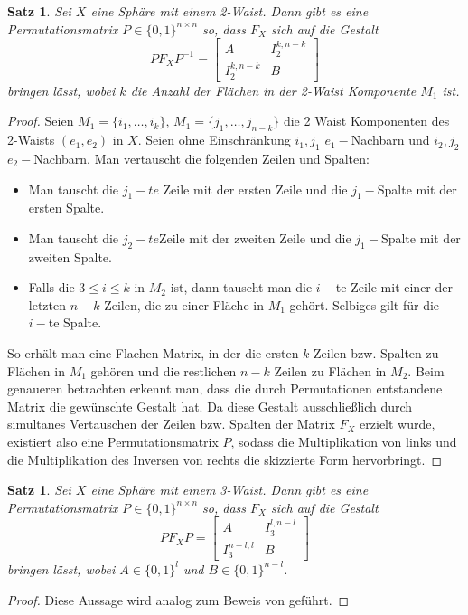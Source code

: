 \documentclass[12pt,titlepage,twoside,cleardoublepage]{article}
\theoremstyle{nummermitklammern}
\newtheorem{satz}[temp]{Satz}
\newtheorem{satz}[zahl]{Satz}
\numberwithin{equation}{section}
\begin{document}
\begin{satz}\label{mat2w}
Sei $X$ eine Sphäre mit einem 2-Waist. Dann gibt es eine Permutationsmatrix $P\in \{0,1\}^{n\times n}$ so, dass $F_X$ sich auf die Gestalt 
\[
PF_XP^{-1}=
\left[ 
\begin{array}{c|c} 
  A & I^{k,n-k}_2 \\ 
  \hline 
  I^{k,n-k}_2 & B 
\end{array} 
\right]
\] 
bringen lässt, wobei $k$ die Anzahl der Flächen in der 2-Waist Komponente $M_1$ ist.
\end{satz}
\begin{proof}
Seien $M_1=\{i_1,\ldots,i_k\}$, $M_1=\{j_1,\ldots,j_{n-k}\}$ die 2 Waist Komponenten des 2-Waists $(e_1,e_2)$ in $X$. Seien ohne Einschränkung $i_1,j_1$ $e_1-$Nachbarn und $i_2,j_2$ $e_2-$Nachbarn. Man vertauscht die folgenden Zeilen und Spalten:
\begin{itemize}
\item Man tauscht die $j_1-te$ Zeile mit der ersten Zeile und die  $j_1-$Spalte mit der ersten Spalte.
\item Man tauscht die $j_2-te$Zeile mit der zweiten Zeile und die  $j_1-$Spalte mit der zweiten Spalte.
\item Falls die $3\leq i \leq k$ in $M_2$ ist, dann tauscht man die $i-$te Zeile mit einer der letzten $n-k$ Zeilen, die zu einer Fläche in $M_1$ gehört. Selbiges gilt für die $i-$te Spalte.
\end{itemize} 
So erhält man eine Flachen Matrix, in der die ersten $k$ Zeilen bzw. Spalten zu  Flächen in $M_1$ gehören und die restlichen $n-k$ Zeilen zu Flächen in $M_2$. Beim genaueren betrachten erkennt man, dass die durch Permutationen entstandene Matrix die gewünschte Gestalt hat. Da diese Gestalt ausschließlich durch simultanes Vertauschen der Zeilen bzw. Spalten der Matrix $F_X$ erzielt wurde, existiert also eine Permutationsmatrix $P$, sodass die Multiplikation von links und die Multiplikation des Inversen von rechts  die skizzierte Form hervorbringt.
\end{proof}

\begin{satz}
Sei $X$ eine Sphäre mit einem 3-Waist. Dann gibt es eine Permutationsmatrix $P\in \{0,1\}^{n \times n}$ so, dass $F_X$ sich auf die Gestalt 
\[
PF_XP=
\left[ 
\begin{array}{c|c} 
  A & I^{l,n-l}_3 \\ 
  \hline 
  I^{n-l,l}_3 & B 
\end{array} 
\right]
\] 
bringen lässt, wobei $A\in \{0,1\}^{l}$ und $B\in \{0,1\}^{n-l}$.
\end{satz}
\begin{proof}
Diese Aussage wird analog zum Beweis von  geführt.
\end{proof}
\end{document}
